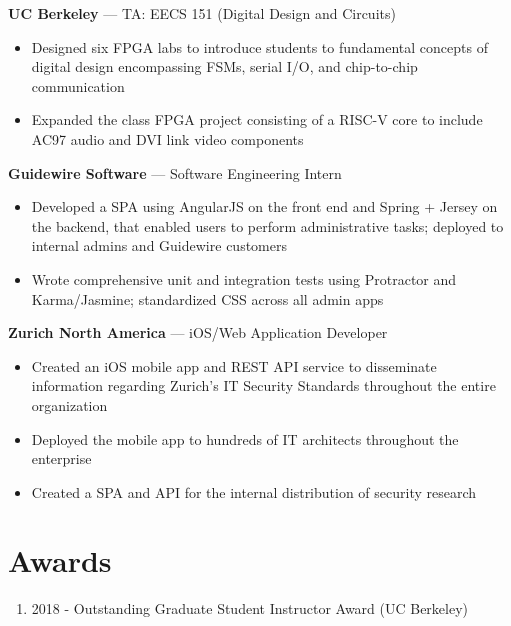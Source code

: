 \documentclass[10pt]{article}
\begin{document}
 \textbf{UC Berkeley} --- TA: EECS 151 (Digital Design and Circuits)
\begin{itemize}
    \item Designed six FPGA labs to introduce students to fundamental concepts of digital design encompassing FSMs, serial I/O, and chip-to-chip communication
    \item Expanded the class FPGA project consisting of a RISC-V core to include AC97 audio and DVI link video components
\end{itemize}

 \textbf{Guidewire Software} --- Software Engineering Intern
\begin{itemize}
    \item Developed a SPA using AngularJS on the front end and Spring + Jersey on the backend, that enabled users to perform administrative tasks; deployed to internal admins and Guidewire customers
    \item Wrote comprehensive unit and integration tests using Protractor and Karma/Jasmine; standardized CSS across all admin apps
\end{itemize}

 \textbf{Zurich North America} --- iOS/Web Application Developer
\begin{itemize}
    \item Created an iOS mobile app and REST API service to disseminate information regarding Zurich’s IT Security Standards throughout the entire organization
    \item Deployed the mobile app to hundreds of IT architects throughout the enterprise
    \item Created a SPA and API for the internal distribution of security research
\end{itemize}

\vspace{-0.2cm}

\section{Awards}
\begin{enumerate}
    \item 2018 - Outstanding Graduate Student Instructor Award (UC Berkeley)
\end{enumerate}
\end{document}
